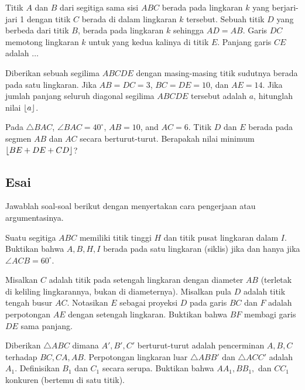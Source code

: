 \documentclass[12pt]{scrartcl}
\begin{document}
	\begin{soalbaru}
		Titik $A$ dan $B$ dari segitiga sama sisi $ABC$ berada pada lingkaran $k$ yang berjari-jari 1 dengan titik $C$ berada di dalam lingkaran $k$ tersebut. Sebuah titik $D$ yang berbeda dari titik $B$, berada pada lingkaran $k$ sehingga $AD=AB$. Garis $DC$ memotong lingkaran $k$ untuk yang kedua kalinya di titik $E$. Panjang garis $CE$ adalah $\dots$ %
	\end{soalbaru}

	\begin{soalbaru}
		Diberikan sebuah segilima $ABCDE$ dengan masing-masing titik sudutnya berada pada satu lingkaran. Jika $AB=DC=3$, $BC=DE=10$, dan $AE=14$. Jika jumlah panjang seluruh diagonal segilima $ABCDE$ tersebut adalah $a$, hitunglah nilai $\left\lfloor a \right\rfloor$.
	\end{soalbaru}
	
	\begin{soalbaru}
		Pada $\triangle BAC$, $\angle BAC = 40^\circ$, $AB=10$, and $AC=6$. Titik $D$ dan $E$ berada pada segmen $AB$ dan $AC$ secara berturut-turut. Berapakah nilai minimum $\left\lfloor BE+DE+CD \right\rfloor$?
	\end{soalbaru}

\subsection{Esai}
Jawablah soal-soal berikut dengan menyertakan cara pengerjaan atau argumentasinya.
	
	\begin{soalbaru} 
		Suatu segitiga $ABC$ memiliki titik tinggi $H$ dan titik pusat lingkaran dalam $I$. Buktikan bahwa $A,B,H,I$ berada pada satu lingkaran (siklis) jika dan hanya jika $\angle ACB = 60^\circ$.
	\end{soalbaru}
	
	\begin{soalbaru} 
		 Misalkan $C$ adalah titik pada setengah lingkaran dengan diameter $AB$ (terletak di keliling lingkarannya, bukan di diameternya). Misalkan pula $D$ adalah titik tengah busur $AC$. Notasikan $E$ sebagai proyeksi $D$ pada garis $BC$ dan $F$ adalah perpotongan $AE$ dengan setengah lingkaran. Buktikan bahwa $BF$ membagi garis $DE$ sama panjang.
	\end{soalbaru}
	
	\begin{soalbaru} 
		Diberikan $\triangle ABC$ dimana $A',B',C'$ berturut-turut adalah pencerminan $A,B,C$ terhadap $BC,CA,AB$. Perpotongan lingkaran luar $\triangle ABB'$ dan $\triangle ACC'$ adalah $A_1$. Definisikan $B_1$ dan $C_1$ secara serupa. Buktikan bahwa $AA_1,BB_1,$ dan $CC_1$ konkuren (bertemu di satu titik).
	\end{soalbaru}
	
\end{document}
